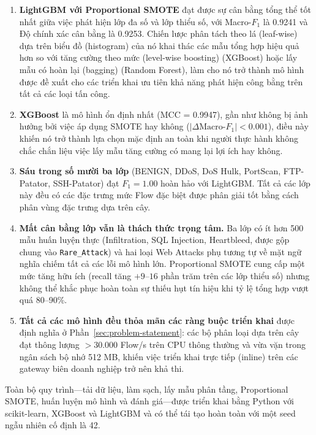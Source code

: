 \begin{enumerate}
    \item \textbf{LightGBM với Proportional SMOTE} đạt được sự cân bằng tổng thể tốt nhất giữa việc phát hiện lớp đa số và lớp thiểu số, với Macro-$F_1$ là 0.9241 và Độ chính xác cân bằng là 0.9253. Chiến lược phân tách theo lá (leaf-wise) dựa trên biểu đồ (histogram) của nó khai thác các mẫu tổng hợp hiệu quả hơn so với tăng cường theo mức (level-wise boosting) (XGBoost) hoặc lấy mẫu có hoàn lại (bagging) (Random Forest), làm cho nó trở thành mô hình được đề xuất cho các triển khai ưu tiên khả năng phát hiện công bằng trên tất cả các loại tấn công.
    \item \textbf{XGBoost} là mô hình ổn định nhất (MCC = 0.9947), gần như không bị ảnh hưởng bởi việc áp dụng SMOTE hay không ($|\Delta\text{Macro-}F_1| < 0.001$), điều này khiến nó trở thành lựa chọn mặc định an toàn khi người thực hành không chắc chắn liệu việc lấy mẫu tăng cường có mang lại lợi ích hay không.
    \item \textbf{Sáu trong số mười ba lớp} (BENIGN, DDoS, DoS Hulk, PortScan, FTP-Patator, SSH-Patator) đạt $F_1 = 1.00$ hoàn hảo với LightGBM. Tất cả các lớp này đều có các đặc trưng mức Flow đặc biệt được phân giải tốt bằng cách phân vùng đặc trưng dựa trên cây.
    \item \textbf{Mất cân bằng lớp vẫn là thách thức trọng tâm.} Ba lớp có ít hơn 500 mẫu huấn luyện thực (Infiltration, SQL Injection, Heartbleed, được gộp chung vào \texttt{Rare\_Attack}) và hai loại Web Attacks phụ tương tự về mặt ngữ nghĩa chiếm tất cả các lỗi mô hình lớn. Proportional SMOTE cung cấp một mức tăng hữu ích (recall tăng $+9$--$16$ phần trăm trên các lớp thiểu số) nhưng không thể khắc phục hoàn toàn sự thiếu hụt tín hiệu khi tỷ lệ tổng hợp vượt quá 80--90\%.
    \item \textbf{Tất cả các mô hình đều thỏa mãn các ràng buộc triển khai} được định nghĩa ở Phần~\ref{sec:problem-statement}: các bộ phân loại dựa trên cây đạt thông lượng $> 30{.}000$ Flow/s trên CPU thông thường và vừa vặn trong ngân sách bộ nhớ 512 MB, khiến việc triển khai trực tiếp (inline) trên các gateway biên doanh nghiệp trở nên khả thi.
\end{enumerate}

Toàn bộ quy trình---tải dữ liệu, làm sạch, lấy mẫu phân tầng, Proportional SMOTE, huấn luyện mô hình và đánh giá---được triển khai bằng Python với scikit-learn, XGBoost và LightGBM và có thể tái tạo hoàn toàn với một seed ngẫu nhiên cố định là 42.

